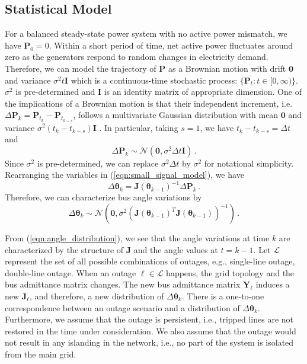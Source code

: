 \subsection{Statistical Model}
\label{sec:statistical_model}
For a balanced steady-state power system with no active power mismatch, we have $\textbf{P}_{0} = 0$. Within a short period of time, net active power fluctuates around zero as the generators respond to random changes in electricity demand. Therefore, we can model the trajectory of $\textbf{P}$ as a Brownian motion with drift $\boldsymbol{0}$ and variance $\sigma^2 t \mathbf{I}$ which is a continuous-time stochastic process: $\{\textbf{P}_t: t \in [0, \infty)\}$. $\sigma^2$ is pre-determined and $\mathbf{I}$ is an identity matrix of appropriate dimension. One of the implications of a Brownian motion is that their independent increment, i.e. $\Delta\textbf{P}_k = \textbf{P}_{t_k} - \textbf{P}_{t_{k-s}}$, follows a multivariate Gaussian distribution with mean $\boldsymbol{0}$ and variance $\sigma^2(t_k - t_{k-s})\mathbf{I}$ \cite{cox2017theory}. In particular, taking $s = 1$, we have 
$
t_{k} - t_{k-s} = \Delta t
$ and 
\begin{equation}
\Delta\textbf{P}_k \sim \mathcal{N}(\boldsymbol{0}, \sigma^2 \Delta t \mathbf{I}) \,.
\end{equation} Since $\sigma^2$ is pre-determined, we can replace $\sigma^2 \Delta t$ by $\sigma^2$ for notational simplicity. Rearranging the variables in (\ref{eqn:small_signal_model}), we have 
\begin{equation}
\Delta \boldsymbol{\theta}_k = \mathbf{J}(\boldsymbol{\theta}_{k-1})^{-1} \Delta \textbf{P}_k \,.
\end{equation}
Therefore, we can characterize bus angle variations by 
\begin{equation}
\label{eqn:angle_distribution}
    \Delta\boldsymbol{\theta}_k \sim  \mathcal{N}(\boldsymbol{0}, \sigma^2 (\mathbf{J}(\boldsymbol{\theta}_{k-1})^{T} \mathbf{J}(\boldsymbol{\theta}_{k-1}))^{-1}) \,.
\end{equation}

From (\ref{eqn:angle_distribution}), we see that the angle variations at time $k$ are characterized by the structure of $\mathbf{J}$ and the angle values at $t = k-1$. Let $\mathcal{L}$ represent the set of all possible combinations of outages, e.g., single-line outage, double-line outage. When an outage $\ell \in \mathcal{L}$ happens, the grid topology and the bus admittance matrix changes. The new bus admittance matrix $\boldsymbol{Y}_{\ell}$ induces a new $\mathbf{J}_{\ell}$, and therefore, a new distribution of $\Delta\boldsymbol{\theta}_k$. There is a one-to-one correspondence between an outage scenario and a distribution of $\Delta\boldsymbol{\theta}_k$. Furthermore, we assume that the outage is persistent, i.e., tripped lines are not restored in the time under consideration. We also assume that the outage would not result in any islanding in the network, i.e., no part of the system is isolated from the main grid. 

